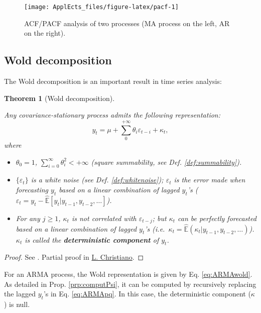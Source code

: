 \documentclass[
  12pt,
]{book}
\providecommand{\tightlist}{%
  \setlength{\itemsep}{0pt}\setlength{\parskip}{0pt}}
\newtheorem{theorem}{Theorem}[chapter]
\theoremstyle{definition}
\theoremstyle{definition}
\theoremstyle{definition}
\theoremstyle{definition}
\theoremstyle{remark}
\begin{document}
\begin{figure}
\texttt{[image: ApplEcts\_files/figure-latex/pacf-1]} \caption{ACF/PACF analysis of two processes (MA process on the left, AR on the right).}\label{fig:pacf}
\end{figure}

\hypertarget{wold-decomposition}{%
\subsection{Wold decomposition}\label{wold-decomposition}}

The Wold decomposition is an important result in time series analysis:

\begin{theorem}[Wold decomposition]
\protect\hypertarget{thm:Wold}{}\label{thm:Wold}

Any covariance-stationary process admits the following representation:
\[
y_t = \mu + \sum_{0}^{+\infty} \theta_i \varepsilon_{t-i} + \kappa_t,
\]
where

\begin{itemize}
\tightlist
\item
  \(\theta_0 = 1\), \(\sum_{i=0}^{\infty} \theta_i^2 < +\infty\) (square summability, see Def. \ref{def:summability}).
\item
  \(\{\varepsilon_t\}\) is a white noise (see Def. \ref{def:whitenoise}); \(\varepsilon_t\) is the error made when forecasting \(y_t\) based on a linear combination of lagged \(y_t\)'s (\(\varepsilon_t = y_t - \hat{\mathbb{E}}[y_t|y_{t-1},y_{t-2},\dots]\)).
\item
  For any \(j \ge 1\), \(\kappa_t\) is not correlated with \(\varepsilon_{t-j}\); but \(\kappa_t\) can be perfectly forecasted based on a linear combination of lagged \(y_t\)'s (i.e.~\(\kappa_t = \hat{\mathbb{E}}(\kappa_t|y_{t-1},y_{t-2},\dots)\)). \(\kappa_t\) is called the \textbf{deterministic component} of \(y_t\).
\end{itemize}

\end{theorem}

\begin{proof}
See \citet{Anderson_1971}. Partial proof in \href{http://faculty.wcas.northwestern.edu/~lchrist/finc520/wold.pdf}{L. Christiano}.
\end{proof}

For an ARMA process, the Wold representation is given by Eq. \eqref{eq:ARMAwold}. As detailed in Prop. \ref{prp:computPsi}, it can be computed by recursively replacing the lagged \(y_t\)'s in Eq. \eqref{eq:ARMApq}. In this case, the deterministic component (\(\kappa\)) is null.
\end{document}
